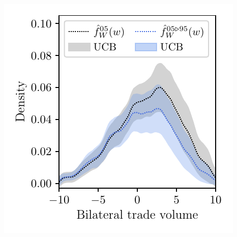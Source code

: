 \documentclass{article}
\begin{document}
\includegraphics[scale=0.5]{graphics/trade_plot_1995_2005.pdf}
\end{document}
